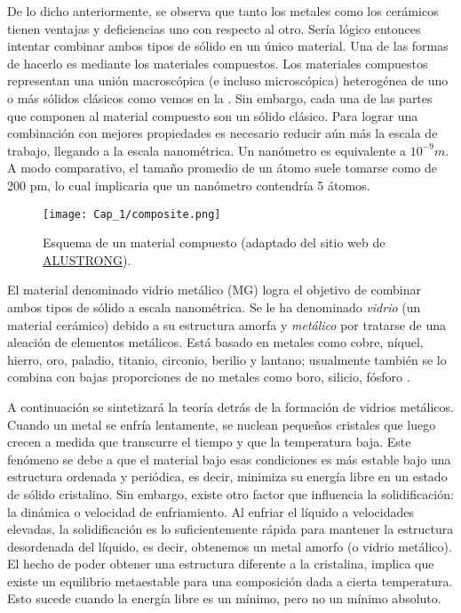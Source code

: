 De lo dicho anteriormente, se observa que tanto los metales como los cerámicos tienen ventajas y deficiencias uno con respecto al otro. Sería lógico entonces intentar combinar ambos tipos de sólido en un único material. Una de las formas de hacerlo es mediante los materiales compuestos. Los materiales compuestos representan una unión macroscópica (e incluso microscópica) heterogénea de uno o más sólidos clásicos como vemos en la . Sin embargo, cada una de las partes que componen al material compuesto son un sólido clásico. Para lograr una combinación con mejores propiedades es necesario reducir aún más la escala de trabajo, llegando a la escala nanométrica. Un nanómetro es equivalente a $10^{-9} m$. A modo comparativo, el tamaño promedio de un átomo suele tomarse como de 200 pm, lo cual implicaria que un nanómetro contendría 5 átomos.

\begin{figure}[h!]
 \centering
 \texttt{[image: Cap\_1/composite.png]}
 \caption[Material compuesto]{Esquema de un material compuesto (adaptado del sitio web de \href{http://www.alustrong.com}{ALUSTRONG}).}
 \label{C1:fg:composite}
\end{figure}

El material denominado vidrio metálico (MG) logra el objetivo de combinar ambos tipos de sólido a escala nanométrica. Se le ha denominado \textit{vidrio} (un material cerámico) debido a su estructura amorfa y \textit{metálico} por tratarse de una aleación de elementos metálicos. Está basado en metales como cobre, níquel, hierro, oro, paladio, titanio, circonio, berilio y lantano; usualmente también se lo combina con bajas proporciones de no metales como boro, silicio, fósforo \citep{andrievski13}.

A continuación se sintetizará la teoría detrás de la formación de vidrios metálicos. Cuando un metal se enfría lentamente, se nuclean pequeños cristales que luego crecen a medida que transcurre el tiempo y que la temperatura baja. Este fenómeno se debe a que el material bajo esas condiciones es más estable bajo una estructura ordenada y periódica, es decir, minimiza su energía libre en un estado de sólido cristalino. Sin embargo, existe otro factor que influencia la solidificación: la dinámica o velocidad de enfriamiento. Al enfriar el líquido a velocidades elevadas, la solidificación es lo suficientemente rápida para mantener la estructura desordenada del líquido, es decir, obtenemos un metal amorfo (o vidrio metálico). El hecho de poder obtener una estructura diferente a la cristalina, implica que existe un equilibrio metaestable para una composición dada a cierta temperatura. Esto sucede cuando la energía libre es un mínimo, pero no un mínimo absoluto.

